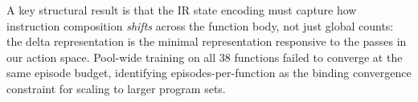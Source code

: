 \documentclass[conference]{IEEEtran}
\begin{document}
A key structural result is that the IR state encoding must capture how
instruction composition \emph{shifts} across the function body, not just
global counts: the delta representation is the minimal representation
responsive to the passes in our action space.
Pool-wide training on all 38 functions failed to converge at the same episode
budget, identifying episodes-per-function as the binding convergence
constraint for scaling to larger program sets.



\end{document}
